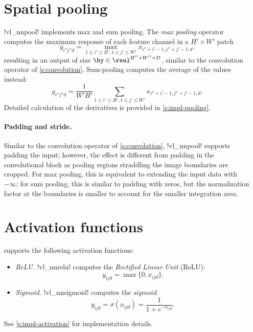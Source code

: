 \section{Spatial pooling}\label{s:pooling}

!vl_nnpool! implements max and sum pooling. The \emph{max pooling} operator computes the maximum response of each feature channel in a $H' \times W'$ patch
\[
y_{i''j''d} = \max_{1\leq i' \leq H', 1 \leq j' \leq W'} x_{i''+i'-1,j''+j'-1,d}.
\]
resulting in an output of size $\by\in\real^{H''\times W'' \times D}$, similar to the convolution operator of \cref{s:convolution}. Sum-pooling computes the average of the values instead:
\[
y_{i''j''d} = \frac{1}{W'H'}
\sum_{1\leq i' \leq H', 1 \leq j' \leq W'} x_{i''+i'-1,j''+j'-1,d}.
\]
Detailed calculation of the derivatives is provided in \cref{s:impl-pooling}.

\paragraph{Padding and stride.} Similar to the convolution operator of \cref{s:convolution}, !vl_nnpool! supports padding the input; however, the effect is different from padding in the convolutional block as pooling regions straddling the image boundaries are cropped. For max pooling, this is equivalent to extending the input data with $-\infty$; for sum pooling, this is similar to padding with zeros, but the normalization factor at the boundaries is smaller to account for the smaller integration area.

\section{Activation functions}\label{s:activation}

\matconvnet supports the following activation functions:
%
\begin{itemize}
\item \emph{ReLU.} !vl_nnrelu! computes the \emph{Rectified Linear Unit} (ReLU):
\[
 y_{ijd} = \max\{0, x_{ijd}\}.
\]

\item \emph{Sigmoid.} !vl_nnsigmoid! computes the \emph{sigmoid}:
\[
 y_{ijd} = \sigma(x_{ijd}) = \frac{1}{1+e^{-x_{ijd}}}.
\]
\end{itemize}
%
See \cref{s:impl-activation} for implementation details.

